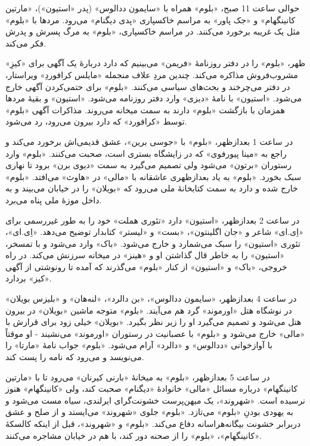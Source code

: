 \documentclass[12pt]{book}
\newcommand{\noun}[1]{«{#1}»}
\begin{document}
    حوالی ساعت 11 صبح، \noun{بلوم} همراه با \noun{سایمون ددالوس} (پدر \noun{استیون})، \noun{مارتین کانینگهام} و \noun{جک پاور} به مراسم خاکسپاری \noun{پدی دیگنام} می‌رود. مردها با \noun{بلوم} مثل یک غریبه برخورد می‌کنند. در مراسم خاکسپاری، \noun{بلوم} به مرگ پسرش و پدرش فکر می‌کند.

    ظهر، \noun{بلوم} را در دفتر روزنامۀ \noun{فریمن} می‌بینیم که دارد دربارۀ یک آگهی برای \noun{کیزِ} مشروب‌فروش مذاکره می‌کند. چندین مردِ علاف منجمله \noun{مایلس کرافوردِ} ویراستار، در دفتر می‌چرخند و بحث‌های سیاسی می‌کنند. \noun{بلوم} برای حتمی‌کردن آگهی خارج می‌شود. \noun{استیون} با نامۀ \noun{دیزی} وارد دفتر روزنامه می‌شود. \noun{استیون} و بقیۀ مردها همزمان با بازگشت \noun{بلوم} دارند به سمت میخانه می‌روند. مذاکرات آگهی \noun{بلوم} توسط \noun{کرافورد} که دارد بیرون می‌رود، رد می‌شود.

    در ساعت 1 بعدازظهر، \noun{بلوم} با \noun{جوسی برین}، عشق قدیمی‌اش برخورد می‌کند و راجع به \noun{مینا پیورفوی} که در زایشگاه بستری است، صحبت می‌کنند. \noun{بلوم} وارد رستوران \noun{برتون} می‌شود ولی تصمیم می‌گیرد به سمت \noun{دیوی برن} برود تا نهاری سبک بخورد. \noun{بلوم} به یاد بعدازظهری عاشقانه با \noun{مالی} در \noun{هاوث} می‌افتد. \noun{بلوم} خارج شده و دارد به سمت کتابخانۀ ملی می‌رود که \noun{بویلان} را در خیابان می‌بیند و به داخل موزۀ ملی پناه می‌برد.

    در ساعت 2 بعدازظهر، \noun{استیون} دارد «تئوری هملت» خود را به طور غیررسمی برای \noun{اِی.ای} شاعر و \noun{جان اگلینتون}، \noun{بست} و \noun{لیستر} کتابدار توضیح می‌دهد. \noun{اِی.ای}، تئوری \noun{استیون} را سبک می‌شمارد و خارج می‌شود. \noun{باک} وارد می‌شود و با تمسخر، \noun{استیون} را به خاطر قال گذاشتن او و \noun{هینز} در میخانه سرزنش می‌کند. در راه خروجی، \noun{باک} و \noun{استیون} از کنار \noun{بلوم} می‌گذرند که آمده تا رونوشتی از آگهی \noun{کیز} بردارد.

    در ساعت 4 بعدازظهر، \noun{سایمون ددالوس}، \noun{بن دالرد}، \noun{لنه‌هان} و \noun{بلیزس بویلان} در نوشگاه هتل \noun{اورموند} گرد هم می‌آیند. \noun{بلوم} متوجه ماشین \noun{بویلان} در بیرون هتل می‌شود و تصمیم می‌گیرد او را زیر نظر بگیرد. \noun{بویلان} خیلی زود برای قرارش با \noun{مالی} خارج می‌شود و \noun{بلوم} با عصبانیت در رستوران \noun{اورموند} می‌نشیند - او موقتاً با آوازخوانی \noun{ددالوس} و \noun{دالرد} آرام می‌شود. \noun{بلوم} جواب نامۀ \noun{مارتا} را می‌نویسد و می‌رود که نامه را پست کند.

    در ساعت 5 بعدازظهر، \noun{بلوم} به میخانۀ \noun{بارنی کیرنان} می‌رود تا با \noun{مارتین کانینگهام} درباره مسائل \noun{مالی} خانوادۀ \noun{دیگنام} صحبت کند، ولی \noun{کانینگهام} هنوز نرسیده است. \noun{شهروند}، یک میهن‌پرست خشونت‌گرای ایرلندی، سیاه مست می‌شود و به یهودی بودنِ \noun{بلوم} می‌تازد. \noun{بلوم} جلوی \noun{شهروند} می‌ایستد و از صلح و عشق دربرابر خشونت بیگانه‌هراسانه دفاع می‌کند. \noun{بلوم} و \noun{شهروند}، قبل از اینکه کالسکۀ \noun{کانینگهام}، \noun{بلوم} را از صحنه دور کند، با هم در خیابان مشاجره می‌کنند.
\end{document}
